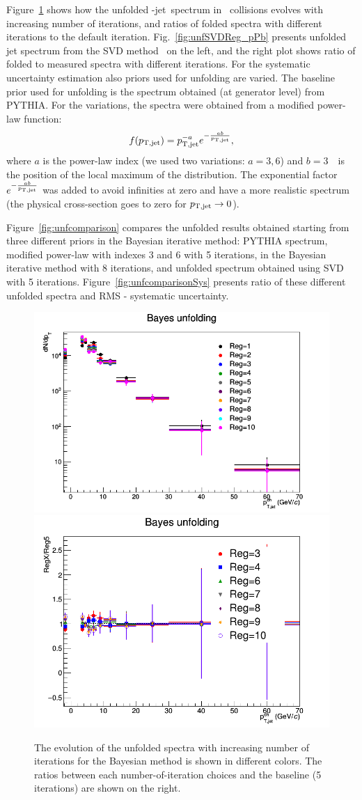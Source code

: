 Figure~\ref{fig:unfBayesReg_pPb} shows how the unfolded  \Dstar-jet\ spectrum in \pPb\ collisions evolves with increasing number of iterations, and ratios of folded spectra with different iterations to the default iteration.
Fig.~\ref{fig:unfSVDReg_pPb} presents unfolded jet spectrum from the SVD method~\cite{Hocker:1995} on the left, and the right plot shows ratio of folded to measured spectra with different iterations.
For the systematic uncertainty estimation also priors used for unfolding are varied. The baseline prior used for unfolding is the spectrum obtained (at generator level) from PYTHIA.
For the variations, the spectra were obtained from a modified power-law function:
\begin{equation}
f(p_{\mathrm{T,jet}}) = p_{\mathrm{T,jet}}^{-a}e^{-\frac{ab}{p_{\mathrm{T,jet}}}},
\end{equation}
where $a$ is the power-law index (we used two variations: $a=3,6$) and $b=3$~\GeVc\ is the position of the local maximum of the distribution. The exponential factor $e^{-\frac{ab}{p_{\mathrm{T,jet}}}}$ was added
to avoid infinities at zero and have a more realistic spectrum (the physical cross-section goes to zero for $p_{\mathrm{T,jet}} \to 0$).

Figure~\ref{fig:unfcomparison} compares the unfolded results obtained starting from three different priors in the Bayesian iterative method: PYTHIA spectrum, modified power-law with indexes $3$ and $6$ with 5 iterations, in the Bayesian iterative method with 8 iterations, and unfolded spectrum obtained using SVD with 5 iterations. Figure~\ref{fig:unfcomparisonSys} presents ratio of these different unfolded spectra and RMS - systematic uncertainty.

\begin{figure}[bth]
\centering
\includegraphics[width=.45\textwidth]{pPbplots/unfolding/PythiaRM__Djet5Excl_2_bayes5_weight_unfSpectra}
\includegraphics[width=.45\textwidth]{pPbplots/unfolding/PythiaRM__Djet5Excl_2_bayes5_weight_unfRatio}
\caption{The evolution of the unfolded spectra with increasing number of iterations for the Bayesian method is shown in different colors.
The ratios between each number-of-iteration choices and the baseline (5 iterations) are shown on the right.}
\label{fig:unfBayesReg_pPb}
\end{figure}

